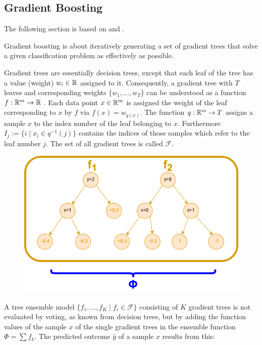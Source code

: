 \subsection{Gradient Boosting}\label{subsec:grad_boost}


The following section is based on \cite{Chen16} and \cite{Murphy}. 

Gradient boosting is about iteratively generating a set of gradient trees that solve a given classification problem as effectively as possible.

Gradient trees are essentially decision trees, except that each leaf of the tree  has a value (weight) $w_i \in \mathbb{R}$ assigned to it. Consequently, a gradient tree with $T$ leaves and corresponding weights $\{w_1, ... ,w_T\}$ can be understood as a function $f: \mathbb{R}^m \to \mathbb{R}$ . Each data point $x \in \mathbb{R}^m$ is assigned the weight of the leaf corresponding to $x$ by $f$ via $f(x) = w_{q(x)}$. The function $q: \mathbb{R}^m \to T$ assigns a sample $x$ to the index number of the leaf belonging to $x$. Furthermore $I_j := \{ i \mid x_i \in q^{-1}(j) \}$ contains the indices of those samples which refer to the leaf number $j$. The set of all gradient trees is called $\mathcal{F}$. 

\begin{minipage}{.45\linewidth}
	\begin{figure}[H]
		\begin{center}
			\includegraphics[width=\linewidth]{images/gradient_trees_example.png}
		\end{center}		
	\end{figure}
\end{minipage}
\hfill
\begin{minipage}{.5\linewidth}
	A tree ensemble model $\{f_1, ... ,f_K \mid f_i \in \mathcal{F}\}$ consisting of $K$ gradient trees is not evaluated by voting, as known from decision trees, but by adding the function values of the sample $x$ of the single gradient trees in the ensemble function $\Phi = \sum f_k$. The predicted outcome $\hat{y}$ of a sample $x$ results from this:
\end{minipage}

